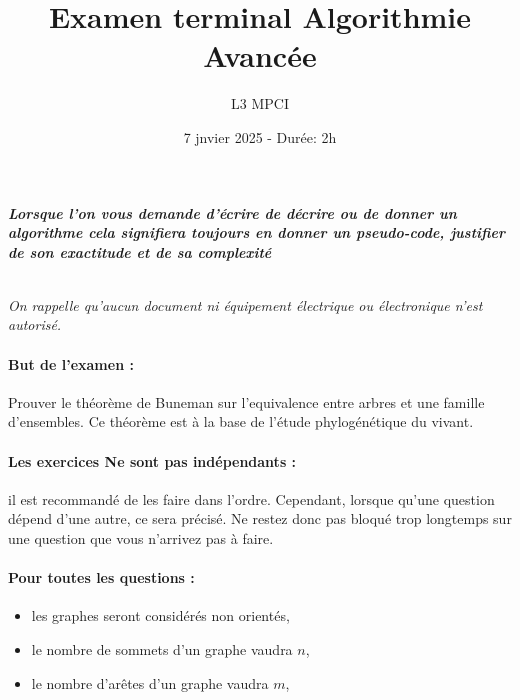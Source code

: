 \documentclass{article}
\title{Examen terminal Algorithmie Avancée}
\author{L3 MPCI}
\date{7 jnvier 2025 - Durée: 2h}
\theoremstyle{exostyle}
\theoremstyle{partiestyle}
\theoremstyle{questionstyle}
\begin{document}
\maketitle

\begin{center}
{\em\bf Lorsque l'on vous demande d'écrire de décrire ou de donner un algorithme cela signifiera toujours en donner un pseudo-code, justifier de son exactitude et de sa complexité}

~\\

{\em On rappelle qu'aucun document ni équipement électrique ou électronique n'est autorisé. }
\end{center}

\paragraph*{But de l'examen :} Prouver le théorème de Buneman sur l'equivalence entre arbres et une famille d'ensembles. Ce théorème est à la base de l'étude phylogénétique du vivant.


\paragraph*{Les exercices Ne sont pas indépendants :} il est recommandé de les faire dans l'ordre. Cependant, lorsque qu'une question dépend d'une autre, ce sera précisé. Ne restez donc pas bloqué trop longtemps sur une question que vous n'arrivez pas à faire.


\paragraph*{Pour toutes les questions :}
\begin{itemize}
\item les graphes seront considérés non orientés,
\item le nombre de sommets d'un graphe vaudra $n$,
\item le nombre d'arêtes d'un graphe vaudra $m$,
\end{itemize}

\clearpage
\end{document}
